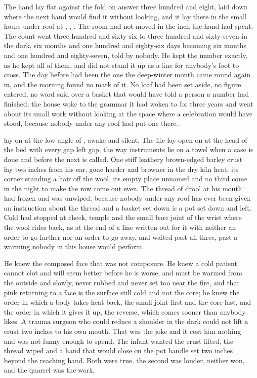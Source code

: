 
The hand lay flat against the fold on answer three hundred and eight, laid down where the next hand would find it without looking, and it lay there in the small hours under  roof at , , . The room had not moved in the inch the hand had spent. The count went three hundred and sixty-six to three hundred and sixty-seven in the dark, six months and one hundred and eighty-six days becoming six months and one hundred and eighty-seven, told by nobody. He kept the number exactly, as he kept all of them, and did not stand it up as a line for anybody's foot to cross. The day before had been the one the deep-winter month came round again in, and the morning found no mark of it. No loaf had been set aside, no figure entered, no word said over a basket that would have told a person a number had finished; the house woke to the grammar it had woken to for three years and went about its small work without looking at the space where a celebration would have stood, because nobody under any roof had put one there.

 lay on  at the low angle of , awake and silent. The file lay open on  at the head of the bed with every gap left gap, the way instruments lie on a towel when a case is done and before the next is called. One stiff leathery brown-edged barley crust lay two inches from his ear, gone harder and browner in the dry kiln heat, its corner standing a hair off the wool, its empty place unnamed and no third come in the night to make the row come out even. The thread of drool at his mouth had frozen and was unwiped, because nobody under any roof has ever been given an instruction about the thread and a basket set down is a pot set down and left. Cold had stopped at cheek, temple and the small bare joint of the wrist where the wool rides back, as at the end of a line written out for it with neither an order to go farther nor an order to go away, and  waited past all three, past a warming nobody in this house would perform.

He knew the composed face that was not composure. He knew a cold patient cannot clot and will seem better before he is worse, and must be warmed from the outside and slowly, never rubbed and never set too near the fire, and that pink returning to a face is the surface still cold and not the core; he knew the order in which a body takes heat back, the small joint first and the core last, and the order in which it gives it up, the reverse, which comes sooner than anybody likes. A trauma surgeon who could reduce a shoulder in the dark could not lift a crust two inches to his own mouth. That was the joke and it cost him nothing and was not funny enough to spend. The infant wanted the crust lifted, the thread wiped and a hand that would close on the pot handle set two inches beyond the reaching hand. Both were true, the second was louder, neither won, and the quarrel was the work.

